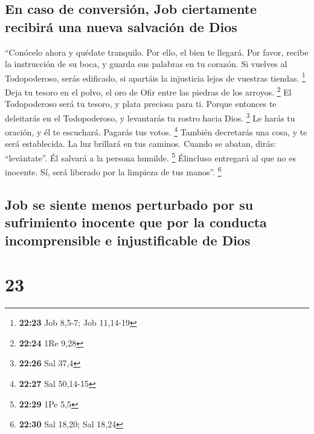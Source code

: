 \hypertarget{en-caso-de-conversiuxf3n-job-ciertamente-recibiruxe1-una-nueva-salvaciuxf3n-de-dios}{%
\subsection{En caso de conversión, Job ciertamente recibirá una nueva
salvación de
Dios}\label{en-caso-de-conversiuxf3n-job-ciertamente-recibiruxe1-una-nueva-salvaciuxf3n-de-dios}}

 ``Conócelo ahora y quédate tranquilo. Por ello, el bien
te llegará.  Por favor, recibe la instrucción de su boca,
y guarda sus palabras en tu corazón.  Si vuelves al
Todopoderoso, serás edificado, si apartáis la injusticia lejos de
vuestras tiendas. \footnote{\textbf{22:23} Job 8,5-7; Job 11,14-19}
 Deja tu tesoro en el polvo, el oro de Ofir entre las
piedras de los arroyos. \footnote{\textbf{22:24} 1Re 9,28}
 El Todopoderoso será tu tesoro, y plata preciosa para
ti.  Porque entonces te deleitarás en el Todopoderoso, y
levantarás tu rostro hacia Dios. \footnote{\textbf{22:26} Sal 37,4}
 Le harás tu oración, y él te escuchará. Pagarás tus
votos. \footnote{\textbf{22:27} Sal 50,14-15}  También
decretarás una cosa, y te será establecida. La luz brillará en tus
caminos.  Cuando se abatan, dirás: ``levántate''. Él
salvará a la persona humilde. \footnote{\textbf{22:29} 1Pe 5,5}
 Élincluso entregará al que no es inocente. Sí, será
liberado por la limpieza de tus manos''. \footnote{\textbf{22:30} Sal
  18,20; Sal 18,24}

\hypertarget{job-se-siente-menos-perturbado-por-su-sufrimiento-inocente-que-por-la-conducta-incomprensible-e-injustificable-de-dios}{%
\subsection{Job se siente menos perturbado por su sufrimiento inocente
que por la conducta incomprensible e injustificable de
Dios}\label{job-se-siente-menos-perturbado-por-su-sufrimiento-inocente-que-por-la-conducta-incomprensible-e-injustificable-de-dios}}

\hypertarget{section-22}{%
\section{23}\label{section-22}}

